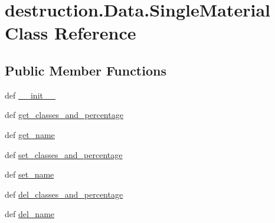 \hypertarget{classdestruction_1_1_data_1_1_single_material}{\section{destruction.\-Data.\-Single\-Material Class Reference}
\label{classdestruction_1_1_data_1_1_single_material}
}
\subsection*{Public Member Functions}
\begin{DoxyCompactItemize}
\item 
def \hyperlink{classdestruction_1_1_data_1_1_single_material_a78fe54ab1191af4b3d913d724929d416}{\-\_\-\-\_\-init\-\_\-\-\_\-}
\item 
def \hyperlink{classdestruction_1_1_data_1_1_single_material_ac77932c3d843e69796de6304cfe39477}{get\-\_\-classes\-\_\-and\-\_\-percentage}
\item 
def \hyperlink{classdestruction_1_1_data_1_1_single_material_aaeb857e69b29cd7514d0c3b242b19b23}{get\-\_\-name}
\item 
def \hyperlink{classdestruction_1_1_data_1_1_single_material_aa2c1dc668eae882fb24272c283dc7ad7}{set\-\_\-classes\-\_\-and\-\_\-percentage}
\item 
def \hyperlink{classdestruction_1_1_data_1_1_single_material_a32a024a0338e376258d5a161ce6b6772}{set\-\_\-name}
\item 
def \hyperlink{classdestruction_1_1_data_1_1_single_material_a747910122e85eb8968cbbcb62744680a}{del\-\_\-classes\-\_\-and\-\_\-percentage}
\item 
def \hyperlink{classdestruction_1_1_data_1_1_single_material_a29de1fc5eb62c9c82c7b1454bfa397aa}{del\-\_\-name}
\end{DoxyCompactItemize}
